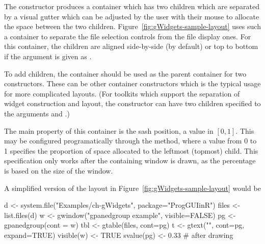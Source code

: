 The  constructor produces a container which
has two children which are separated by a visual gutter which can be
adjusted by the user with their mouse to allocate the space between the two
children. Figure~\ref{fig:gWidgets-sample-layout} uses such a
container to separate the file selection controls from the file
display ones.  For this container, the children are aligned
side-by-side (by default) or top to bottom if the
 argument is given as
. 


To add children, the container should be used as the parent container
for two constructors. These can be other container constructors which
is the typical usage for more complicated layouts.
(For toolkits which support the separation of widget
construction and layout, the  constructor can
have two children specified to the arguments
 and .)

The main property of this container is the sash position, a value in
$[0,1]$. This may be configured programatically
through the  method, where a value
from 0 to 1 specifies the proportion of space allocated to the
leftmost (topmost) child. This specification only works after the
containing window is drawn, as the percentage is based on the size of
the window.


A simplified version of the layout in
Figure~\ref{fig:gWidgets-sample-layout} would be
\begin{Schunk}
\begin{Sinput}
 d <- system.file("Examples/ch-gWidgets", package="ProgGUIinR")
 files <- list.files(d)
 w <- gwindow("gpanedgroup example", visible=FALSE)
 pg <- gpanedgroup(cont = w)
 tbl <- gtable(files, cont=pg)
 t <- gtext("", cont=pg, expand=TRUE)
 visible(w) <- TRUE
 svalue(pg) <- 0.33                      # after drawing
\end{Sinput}
\end{Schunk}




